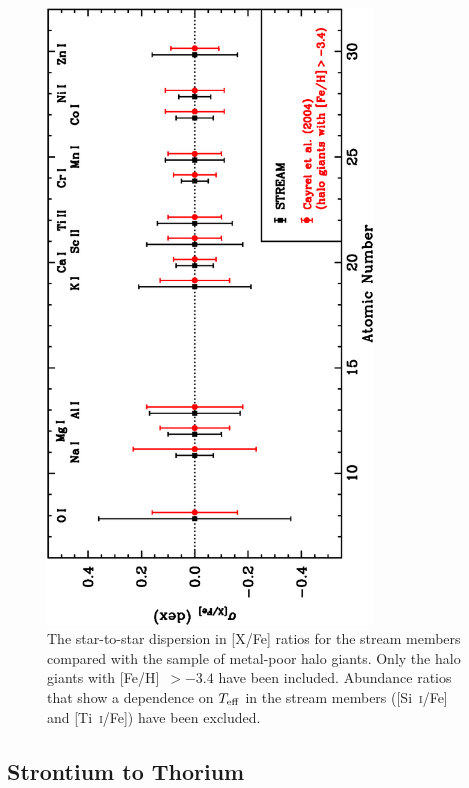 \documentclass{emulateapj}
\begin{document}
\begin{figure}
\includegraphics[angle=270,width=3.4in]{fig11.eps}
\caption{
\label{dispersionplot}
The star-to-star dispersion in [X/Fe] ratios for the stream members
compared with the \citet{cayrel04} sample of metal-poor halo giants.
Only the halo giants with [Fe/H]~$> -3.4$ have been included.
Abundance ratios that show a dependence on $T_{\rm eff}$ in the 
stream members ([Si~\textsc{i}/Fe] and [Ti~\textsc{i}/Fe]) have
been excluded.
}
\end{figure}



\subsection{Strontium to Thorium}
\end{document}
